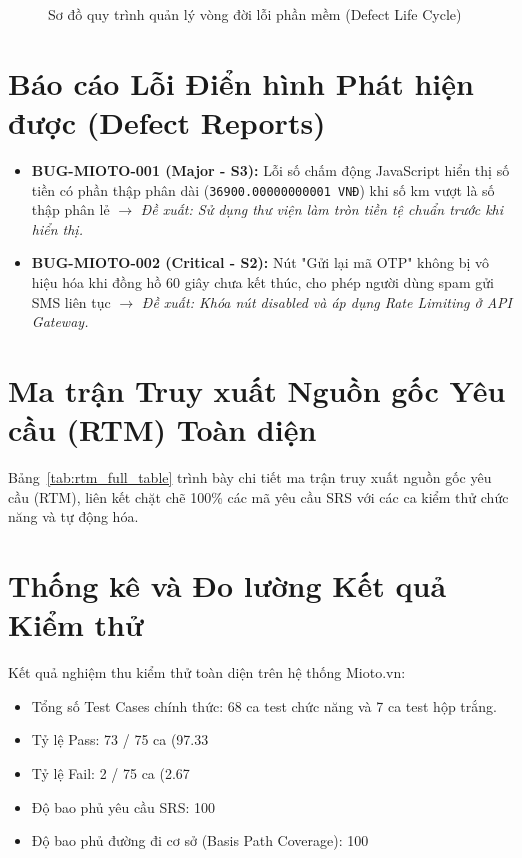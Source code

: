 \documentclass[12pt,a4paper,oneside]{report}
\begin{document}
\begin{figure}[ht]
{
  }
  \caption{Sơ đồ quy trình quản lý vòng đời lỗi phần mềm (Defect Life Cycle)}
  \label{fig:defect_lifecycle}
\end{figure}

\section{Báo cáo Lỗi Điển hình Phát hiện được (Defect Reports)}
\begin{itemize}
  \item \textbf{BUG-MIOTO-001 (Major - S3):} Lỗi số chấm động JavaScript hiển thị số tiền có phần thập phân dài (\texttt{36900.00000000001 VNĐ}) khi số km vượt là số thập phân lẻ $\to$ \textit{Đề xuất: Sử dụng thư viện làm tròn tiền tệ chuẩn trước khi hiển thị.}
  \item \textbf{BUG-MIOTO-002 (Critical - S2):} Nút "Gửi lại mã OTP" không bị vô hiệu hóa khi đồng hồ 60 giây chưa kết thúc, cho phép người dùng spam gửi SMS liên tục $\to$ \textit{Đề xuất: Khóa nút disabled và áp dụng Rate Limiting ở API Gateway.}
\end{itemize}

\section{Ma trận Truy xuất Nguồn gốc Yêu cầu (RTM) Toàn diện}
Bảng~\ref{tab:rtm_full_table} trình bày chi tiết ma trận truy xuất nguồn gốc yêu cầu (RTM), liên kết chặt chẽ 100\% các mã yêu cầu SRS với các ca kiểm thử chức năng và tự động hóa.



\section{Thống kê và Đo lường Kết quả Kiểm thử}
Kết quả nghiệm thu kiểm thử toàn diện trên hệ thống Mioto.vn:
\begin{itemize}
  \item Tổng số Test Cases chính thức: 68 ca test chức năng và 7 ca test hộp trắng.
  \item Tỷ lệ Pass: 73 / 75 ca (97.33%
  \item Tỷ lệ Fail: 2 / 75 ca (2.67%
  \item Độ bao phủ yêu cầu SRS: 100%
  \item Độ bao phủ đường đi cơ sở (Basis Path Coverage): 100%
\end{itemize}
\end{document}

